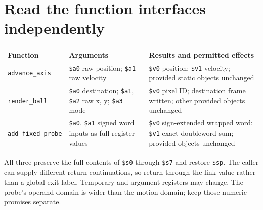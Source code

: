 \section{Read the function interfaces independently}\label{ball-x-interfaces}
\begin{longtable}{p{32mm}p{59mm}p{56mm}}
  \toprule
  Function                   & Arguments                                                                            & Results and permitted effects                                                                            \\
  \midrule
  \texttt{advance\_axis}     & \texttt{\$a0} raw position; \texttt{\$a1} raw velocity                               & \texttt{\$v0} position; \texttt{\$v1} velocity; provided static objects unchanged                        \\
  \texttt{render\_ball}      & \texttt{\$a0} destination; \texttt{\$a1}, \texttt{\$a2} raw x, y; \texttt{\$a3} mode & \texttt{\$v0} pixel ID; destination frame written; other provided objects unchanged                      \\
  \texttt{add\_fixed\_probe} & \texttt{\$a0}, \texttt{\$a1} signed word inputs as full register values              & \texttt{\$v0} sign-extended wrapped word; \texttt{\$v1} exact doubleword sum; provided objects unchanged \\
  \bottomrule
\end{longtable}
All three preserve the full contents of \texttt{\$s0} through \texttt{\$s7}
and restore \texttt{\$sp}. The caller can supply different return continuations,
so return through the link value rather than a global exit label. Temporary and
argument registers may change. The probe's operand domain is wider than the
motion domain; keep those numeric promises separate.
